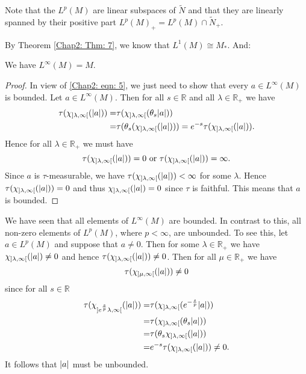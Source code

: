 Note that the $L^p(M)$ are linear subspaces of $\tilde{N}$ and that they are linearly spanned by their positive part $L^p(M)_+=L^p(M)\cap \tilde{N}_+$.\par
By Theorem \ref{Chap2: Thm: 7}, we know that $L^1(M)\cong M_*$. And:
\begin{proposition}\label{Chap2: Prop: 10}
    We have $L^\infty(M)=M$.
\end{proposition}
\begin{proof}
    In view of \eqref{Chap2: eqn: 5}, we just need to show that every $a\in L^\infty(M)$ is bounded. Let $a\in L^\infty(M)$. Then for all $s\in \mathbb{R}$ and all $\lambda\in \mathbb{R}_+$ we have
    \[
        \begin{split}
            \tau(\chi_{]\lambda,\infty[}(\abs{a}))=&\tau(\chi_{]\lambda,\infty[}(\theta_s\abs{a}))\\
            =&\tau(\theta_s(\chi_{]\lambda,\infty[}(\abs{a})))=e^{-s}\tau(\chi_{]\lambda,\infty[}(\abs{a})).
        \end{split}
    \]
    Hence for all $\lambda\in \mathbb{R}_+$ we must have
    \[
        \tau(\chi_{]\lambda,\infty[}(\abs{a}))=0 \text{ or } \tau(\chi_{]\lambda,\infty[}(\abs{a}))=\infty.
    \]
    Since $a$ is $\tau$-measurable, we have $\tau(\chi_{]\lambda,\infty[}(\abs{a}))<\infty$ for some $\lambda$. Hence $\tau(\chi_{]\lambda,\infty[}(\abs{a}))=0$ and thus $\chi_{]\lambda,\infty[}(\abs{a})=0$ since $\tau$ is faithful. This means that $a$ is bounded.
\end{proof}
\begin{remark}
    We have seen that all elements of $L^\infty(M)$ are bounded. In contrast to this, all non-zero elements of $L^p(M)$, where $p<\infty$, are unbounded. To see this, let $a\in L^p(M)$ and suppose that $a\neq 0$. Then for some $\lambda\in \mathbb{R}_+$ we have $\chi_{]\lambda,\infty[}(\abs{a})\neq 0$ and hence $\tau(\chi_{]\lambda,\infty[}(\abs{a}))\neq 0$. Then for all $\mu\in \mathbb{R}_+$ we have
    \[
        \tau(\chi_{]\mu,\infty[}(\abs{a}))\neq 0
    \]
    since for all $s\in \mathbb{R}$
    \[
        \begin{split}
            \tau(\chi_{]e^\frac{s}{p}\lambda,\infty[}(\abs{a}))=&\tau(\chi_{]\lambda,\infty[}(e^{-\frac{s}{p}}\abs{a}))\\
            =&\tau(\chi_{]\lambda,\infty[}(\theta_s\abs{a}))\\
            =&\tau(\theta_s\chi_{]\lambda,\infty[}(\abs{a}))\\
            =&e^{-s}\tau(\chi_{]\lambda,\infty[}(\abs{a}))\neq 0.
        \end{split}
    \]
    It follows that $\abs{a}$ must be unbounded.
\end{remark}
